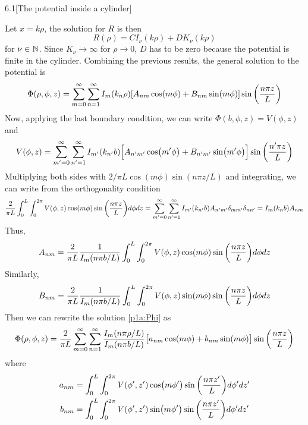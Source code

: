 \documentclass[12pt]{article}
\begin{document}
\begin{problem}{6.1}[The potential inside a cylinder]
\begin{solution}
\begin{equation}
\end{equation}
Let $x=k\rho$, the solution for $R$ is then
\begin{equation}
    R(\rho)=CI_\nu(k\rho)+DK_\nu(k\rho)
\end{equation}
for $\nu\in\mathbb{N}$. Since $K_\nu\to\infty$ for $\rho\to 0$, $D$ has to be zero 
because the potential is finite in the cylinder. Combining the previous 
results, the general solution to the potential is
\begin{equation}\label{p1a:Phi}
    \Phi(\rho,\phi,z)=\sum_{m=0}^\infty\sum_{n=1}^\infty
    I_m(k_n\rho)[A_{nm}\cos(m\phi)+B_{nm}\sin(m\phi)]\sin\qty(\frac{n\pi z}{L})
\end{equation}
Now, applying the last boundary condition, we can write
$\Phi(b,\phi,z)=V(\phi,z)$ and
\begin{equation}
    V(\phi,z)=\sum_{m'=0}^\infty\sum_{n'=1}^\infty
    I_{m'}(k_{n'}b)\qty[A_{n'm'}\cos(m'\phi)+B_{n'm'}\sin(m'\phi)]\sin\qty(\frac{n'\pi z}{L})
\end{equation}
Multiplying both sides with $2 /\pi L\cos(m\phi)\sin(n\pi z /L)$ and
integrating, we can write from the orthogonality condition
\begin{equation}
    \frac2{\pi L}\int_0^L\int_0^{2\pi}V(\phi,z)\cos(m\phi)\sin\qty(\frac{n\pi
    z}{L})d\phi dz=\sum_{m'=0}^\infty\sum_{n'=1}^\infty I_{m'}(k_{n'}b)
    A_{n'm'}\delta_{mm'}\delta_{nn'}=I_m(k_nb)A_{nm}
\end{equation}
Thus,
\begin{equation}
    A_{nm}=\frac2{\pi L}\frac1{I_m(n\pi
    b/L)}\int_0^L\int_0^{2\pi}V(\phi,z)\cos(m\phi)\sin\qty(\frac{n\pi
z}{L})d\phi dz 
\end{equation}
Similarly,
\begin{equation}
    B_{nm}=\frac2{\pi L}\frac1{I_m(n\pi
    b/L)}\int_0^L\int_0^{2\pi}V(\phi,z)\sin(m\phi)\sin\qty(\frac{n\pi
z}{L})d\phi dz 
\end{equation}
Then we can rewrite the solution \eqref{p1a:Phi} as
\begin{equation}
    \Phi(\rho,\phi,z)
    =\frac2{\pi L}\sum_{m=0}^\infty\sum_{n=1}^\infty
    \frac{I_m(n\pi \rho/L)}{I_m(n\pi
    b/L)}\qty[a_{nm}\cos(m\phi)+b_{nm}\sin(m\phi)]\sin\qty(\frac{n\pi z}{L})
\end{equation}
where
\begin{subequations}\label{p1a:coeff}
    \begin{align}
        a_{nm}
        &=\int_0^L\int_0^{2\pi}V(\phi',z')\cos(m\phi')\sin\qty(\frac{n\pi
        z'}{L})d\phi'dz'\\ 
        b_{nm}
        &=\int_0^L\int_0^{2\pi}V(\phi',z')\sin(m\phi')\sin\qty(\frac{n\pi
        z'}{L})d\phi'dz'
    \end{align} 
\end{subequations}


\end{solution}
\end{problem}
\end{document}
